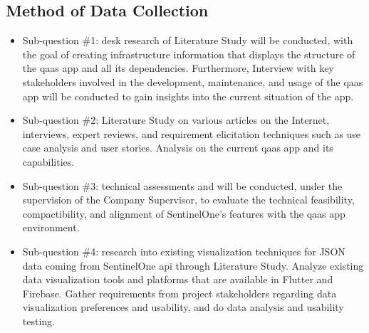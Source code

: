 \begin{multicols}{2}
      \subsection{Method of Data Collection}
      \begin{itemize}[label=-]
            \item Sub-question \#1: desk research of Literature Study will be conducted, with the goal of creating
                  infrastructure information that displays the structure of the \acrshort{qaas} app and all its
                  dependencies. Furthermore, Interview with key stakeholders involved in the  development, maintenance,
                  and usage of the \acrshort{qaas} app will be conducted to gain insights into the current situation
                  of the app.
            \item Sub-question \#2: Literature Study on various articles on the Internet, interviews, expert reviews,
                  and requirement elicitation techniques such as use case analysis and user stories. Analysis on the
                  current \acrshort{qaas} app and its capabilities.
            \item Sub-question \#3: technical assessments and will be conducted, under the supervision of the Company
                  Supervisor, to evaluate the technical feasibility, compactibility, and alignment of SentinelOne's
                  features with the \acrshort{qaas} app environment.
            \item Sub-question \#4: research into existing visualization techniques for \gls{JSON} data coming from
                  SentinelOne \acrshort{api} through Literature Study. Analyze existing data visualization tools and
                  platforms that are available in Flutter and Firebase. Gather requirements from project stakeholders
                  regarding data visualization preferences and usability, and do data analysis and usability testing.

\end{itemize}
\end{multicols}
